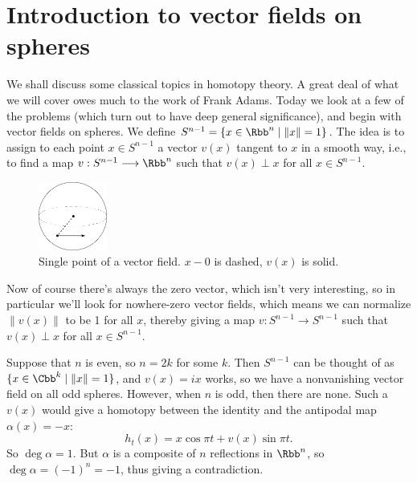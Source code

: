 
\section{Introduction to vector fields on spheres} %
\label{IntroductionToVectorFieldsOnSpheres}
\ifx\OutputIntroductionToVectorFieldsOnSpheres\undefined\else

We shall discuss some classical topics in homotopy theory.  A great deal of what we will cover owes much to the work of Frank Adams.  Today we look at a few of the problems (which turn out to have deep general significance), and begin with vector fields on spheres.  We define $S^{n-1} = \{x \in \Rbb^n \mid \|x\| = 1\}$.  The idea is to assign to each point $x \in S^{n-1}$ a vector $v(x)$ tangent to $x$ in a smooth way, i.e., to find a map $v: S^{n-1} \to \Rbb^n$ such that $v(x) \perp x$ for all $x \in S^{n-1}$.

\begin{figure}
\centering\includegraphics[width=0.2\textwidth]{figures/fig1.pdf}
\caption{\small Single point of a vector field. $x - 0$ is dashed, $v(x)$ is solid.}
\end{figure}

Now of course there's always the zero vector, which isn't very interesting, so in particular we'll look for nowhere-zero vector fields, which means we can normalize $\|v(x)\|$ to be 1 for all $x$, thereby giving a map $v: S^{n-1} \to S^{n-1}$ such that $v(x) \perp x$ for all $x \in S^{n-1}$. %

Suppose that $n$ is even, so $n = 2k$ for some $k$.  Then $S^{n-1}$ can be thought of as $\{x \in \Cbb^k \mid \|x\| = 1\}$, and $v(x) = ix$ works, so we have a nonvanishing vector field on all odd spheres.  However, when $n$ is odd, then there are none.  Such a $v(x)$ would give a homotopy between the identity and the antipodal map $\alpha(x) = -x$: \[h_t(x) = x \cos \pi t + v(x) \sin \pi t.\]  So $\deg \alpha = 1$.  But $\alpha$ is a composite of $n$ reflections in $\Rbb^n$, so $\deg \alpha = (-1)^n = -1$, thus giving a contradiction.

